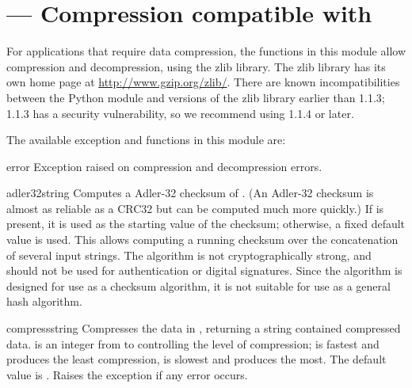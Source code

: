 \section{ ---
         Compression compatible with }



For applications that require data compression, the functions in this
module allow compression and decompression, using the zlib library.
The zlib library has its own home page at \url{http://www.gzip.org/zlib/}.  
There are known incompatibilities between the Python module and
versions of the zlib library earlier than 1.1.3; 1.1.3 has a security
vulnerability, so we recommend using 1.1.4 or later.

The available exception and functions in this module are:

\begin{excdesc}{error}
  Exception raised on compression and decompression errors.
\end{excdesc}


\begin{funcdesc}{adler32}{string}
   Computes a Adler-32 checksum of .  (An Adler-32
   checksum is almost as reliable as a CRC32 but can be computed much
   more quickly.)  If  is present, it is used as the
   starting value of the checksum; otherwise, a fixed default value is
   used.  This allows computing a running checksum over the
   concatenation of several input strings.  The algorithm is not
   cryptographically strong, and should not be used for
   authentication or digital signatures.  Since the algorithm is
   designed for use as a checksum algorithm, it is not suitable for
   use as a general hash algorithm.
\end{funcdesc}

\begin{funcdesc}{compress}{string}
  Compresses the data in , returning a string contained
  compressed data.   is an integer from  to
   controlling the level of compression;  is fastest
  and produces the least compression,  is slowest and produces
  the most.  The default value is .  Raises the
   exception if any error occurs.
\end{funcdesc}

